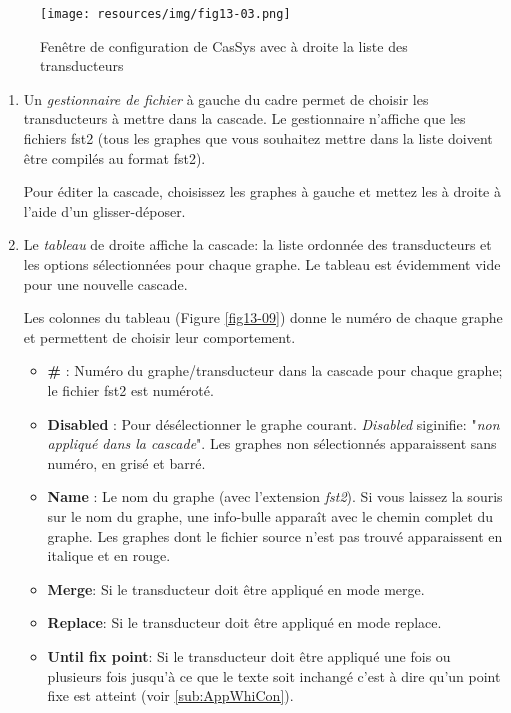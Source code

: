 \begin{figure}[!htb]
  \centering
  \texttt{[image: resources/img/fig13-03.png]}
  \caption{Fenêtre de configuration de CasSys avec à droite la liste des transducteurs}
  \label{fig13-03}
\end{figure}

\begin{enumerate}
	\item Un \textit{gestionnaire de fichier} à gauche du cadre permet de choisir les transducteurs à mettre dans la cascade.
	Le gestionnaire n'affiche que les fichiers fst2 (tous les graphes que vous souhaitez mettre dans la liste doivent être compilés au format fst2).
	
	Pour éditer la cascade, choisissez les graphes à gauche et mettez les à droite à l'aide d'un glisser-déposer.
\item Le \textit{tableau} de droite affiche la cascade: la liste ordonnée des transducteurs et les options sélectionnées pour chaque graphe.
		Le tableau est évidemment vide pour une nouvelle cascade.
		 
		Les colonnes du tableau (Figure \ref{fig13-09}) donne le numéro de chaque graphe et permettent de choisir leur comportement.
	\begin{itemize}
	\item \textbf{\#} : Numéro du graphe/transducteur dans la cascade pour chaque graphe; le fichier fst2 est numéroté.
	\item \textbf{Disabled} : Pour désélectionner le graphe courant. \textit{Disabled} siginifie: "\textit{non appliqué dans la cascade}".
		Les graphes non sélectionnés apparaissent sans numéro, en grisé et barré.
	\item \textbf{Name} : Le nom du graphe (avec l'extension \emph{fst2}). Si vous laissez la souris sur le nom du graphe,
		une info-bulle apparaît avec le chemin complet du graphe.
		Les graphes dont le fichier source n'est pas trouvé apparaissent en italique et en rouge.

	\item \textbf{Merge}: Si le transducteur doit être appliqué en mode merge.
	\item \textbf{Replace}: Si le transducteur doit être appliqué en mode replace.
	\item \textbf{Until fix point}: Si le transducteur doit être appliqué une fois ou plusieurs fois
		jusqu'à ce que le texte soit inchangé c'est à dire qu'un point fixe est atteint (voir \ref{sub:AppWhiCon}).
	\end{itemize}
	

\end{enumerate}
